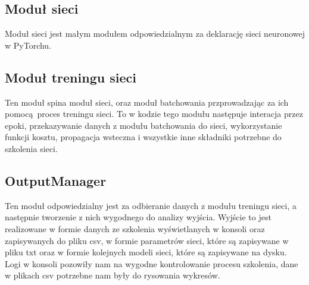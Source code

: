\subsection{Moduł sieci} 
Moduł sieci jest małym modułem odpowiedzialnym za deklarację sieci neuronowej w PyTorchu.
 
\subsection{Moduł treningu sieci}
Ten moduł spina moduł sieci, oraz moduł batchowania przprowadzając za ich pomocą proces treningu sieci.
To w kodzie tego modułu następuje interacja przez epoki, przekazywanie danych z modułu batchowania 
do sieci, wykorzystanie funkcji kosztu, propagacja wsteczna i wszystkie inne składniki potrzebne do 
szkolenia sieci. 

\subsection{OutputManager}
Ten moduł odpowiedzialny jest za odbieranie danych z modułu treningu sieci, a następnie tworzenie z nich
wygodnego do analizy wyjścia. Wyjście to jest realizowane w formie danych ze szkolenia wyświetlanych 
w konsoli oraz zapisywanych do pliku csv, w formie parametrów sieci, które są zapisywane
w pliku txt oraz w formie kolejnych modeli sieci, które są zapisywane na dysku. 
Logi w konsoli pozowiły nam na wygodne kontrolowanie procesu szkolenia, dane w plikach csv potrzebne 
nam były do rysowania wykresów.

\newpage
